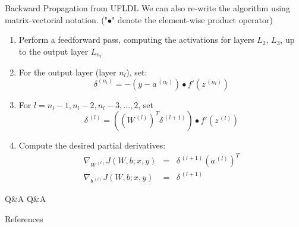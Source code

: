 \documentclass[10pt]{beamer}
\begin{document}
	\begin{frame}{Backward Propagation from UFLDL}
		We can also re-write the algorithm using matrix-vectorial notation. ("$\bullet$" denote the element-wise product operator)
		\begin{enumerate}
			\pause
			\item Perform a feedforward pass, computing the activations for layers $L_2$, $L_3$, up to the output layer $L_{n_l}$
			\pause
			\item For the output layer (layer $n_l$), set:
			$$\delta^(n_l)=-(y-a^{\,(n_l)})\bullet f'(z^{\,(n_l)})$$
			
			\pause
			\item For $l=n_l-1, n_l-2, n_l-3,\dots,2$, set
			$$\delta^{\,(l)}=\left((W^{\,(l)})^T\delta^{\,(l+1)}\right)\bullet f'(z^{\,(l)})$$
			
			\pause
			\item Compute the desired partial derivatives:
			\begin{eqnarray}
				\nabla_{W^{\,(l)}}J(W,b;x,y)&=&\delta^{\,(l+1)}(a^{\,(l)})^T\\
				\nabla_{b^{\,(l)}}J(W,b;x,y)&=&\delta^{\,(l+1)}
			\end{eqnarray}
		\end{enumerate}
	\end{frame}
	
	\begin{frame}{Q\&A}
		Q\&A
	\end{frame}


	\begin{frame}[allowframebreaks]{References}
		
		
	\end{frame}
\end{document}
